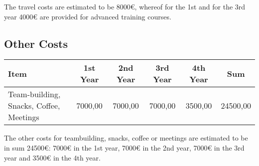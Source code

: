 The travel costs are estimated to be 8000\euro{}, whereof for the 1st and for the 3rd year 4000\euro{} are provided for advanced training courses.


\subsection{Other Costs}
\begin{tabular}{|l|c|c|c|c|c|}
\hline 
Item & 1st Year & 2nd Year & 3rd Year & 4th Year & Sum \\ 
\hline 
Team-building, Snacks, Coffee, Meetings & 7000,00 & 7000,00 & 7000,00 & 3500,00 & 24500,00 \\
\hline 
\end{tabular} 

The other costs for teambuilding, snacks, coffee or meetings are estimated to be in sum 24500\euro{}: 7000\euro{} in the 1st year, 7000\euro{} in the 2nd year, 7000\euro{} in the 3rd year and 3500\euro{} in the 4th year.
